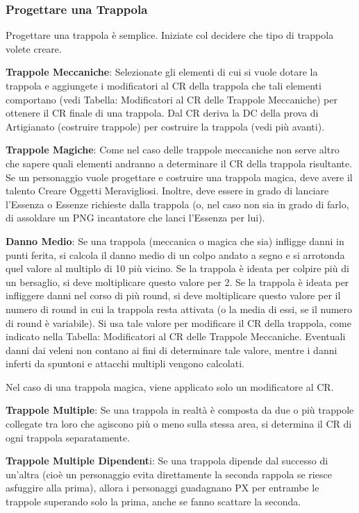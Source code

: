 \documentclass[a4paper,11pt,twoside,openany]{book}
\begin{document}
{\subsubsection{Progettare una Trappola}

Progettare una trappola è semplice. Iniziate col decidere che tipo di trappola volete creare.

\textbf{Trappole Meccaniche}: Selezionate gli elementi di cui si vuole dotare la trappola e aggiungete i modificatori al CR della trappola che tali elementi comportano (vedi Tabella: Modificatori al CR delle Trappole Meccaniche) per ottenere il CR finale di una trappola. Dal CR deriva la DC della prova di Artigianato (costruire trappole) per costruire la trappola (vedi più avanti).

\textbf{Trappole Magiche}: Come nel caso delle trappole meccaniche non serve altro che sapere quali elementi andranno a determinare il CR della trappola risultante. Se un personaggio vuole progettare e costruire una trappola magica, deve avere il talento Creare Oggetti Meravigliosi. Inoltre, deve essere in grado di lanciare l'Essenza o Essenze richieste dalla trappola (o, nel caso non sia in grado di farlo, di assoldare un PNG incantatore che lanci l'Essenza per lui).

\textbf{Danno Medio}: Se una trappola (meccanica o magica che sia) infligge danni in punti ferita, si calcola il danno medio di un colpo andato a segno e si arrotonda quel valore al multiplo di 10 più vicino. Se la trappola è ideata per colpire più di un bersaglio, si deve moltiplicare questo valore per 2. Se la trappola è ideata per infliggere danni nel corso di più round, si deve moltiplicare questo valore per il numero di round in cui la trappola resta attivata (o la media di essi, se il numero di round è variabile). Si usa tale valore per modificare il CR della trappola, come indicato nella Tabella: Modificatori al CR delle Trappole Meccaniche. Eventuali danni dai veleni non contano ai fini di determinare tale valore, mentre i danni inferti da spuntoni e attacchi multipli vengono calcolati.

Nel caso di una trappola magica, viene applicato solo un modificatore al CR.

\textbf{Trappole Multiple}: Se una trappola in realtà è composta da due o più trappole collegate tra loro che agiscono più o meno sulla stessa area, si determina il CR di ogni trappola separatamente.

\textbf{Trappole Multiple Dipendent}i: Se una trappola dipende dal successo di un'altra (cioè un personaggio evita direttamente la seconda rappola se riesce asfuggire alla prima), allora i personaggi guadagnano PX per entrambe le trappole superando solo la prima, anche se fanno scattare la seconda.

}
\end{document}
